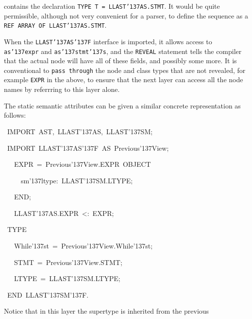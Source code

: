 {{contains the declaration {\tt TYPE T = LLAST\char'137{}AS.STMT}.  It would be quite
permissible, although not very convenient for a parser, to define the
sequence as a {\tt REF ARRAY OF LLAST\char'137{}AS.STMT}.
\par
When the {\tt LLAST\char'137{}AS\char'137{}F} interface is imported, it allows access to
{\tt as\char'137{}expr} and {\tt as\char'137{}stmt\char'137{}s}, and the {\tt REVEAL} statement tells the
compiler that the actual node will have all of these fields, and
possibly some more. It is conventional to {\tt pass through} the node and
class types that are not revealed, for example {\tt EXPR} in the above, to
ensure that the next layer can access all the node names by referrring
to this layer alone.
\par
The static semantic attributes can be given a similar concrete
representation as follows:
\par
\par{}\noindent\par
{\display ~IMPORT~AST,~LLAST\char'137{}AS,~LLAST\char'137{}SM;}\noindent\par
{\display ~IMPORT~LLAST\char'137{}AS\char'137{}F~AS~Previous\char'137{}View;}\noindent\par
\medskip\noindent%
\par{}\noindent\par
{\display ~~~EXPR~=~Previous\char'137{}View.EXPR~OBJECT}\noindent\par
{\display ~~~~~sm\char'137{}ltype:~LLAST\char'137{}SM.LTYPE;}\noindent\par
{\display ~~~END;}\noindent\par
\medskip\noindent%
\par{}\noindent\par
{\display ~~~LLAST\char'137{}AS.EXPR~<:~EXPR;}\noindent\par
{\display ~TYPE}\noindent\par
{\display ~~~While\char'137{}st~=~Previous\char'137{}View.While\char'137{}st;}\noindent\par
{\display ~~~STMT~=~Previous\char'137{}View.STMT;}\noindent\par
{\display ~~~LTYPE~=~LLAST\char'137{}SM.LTYPE;}\noindent\par
{\display ~END~LLAST\char'137{}SM\char'137{}F.}\noindent\par
\medskip\noindent%
Notice that in this layer the supertype is inherited from the previous
}}
